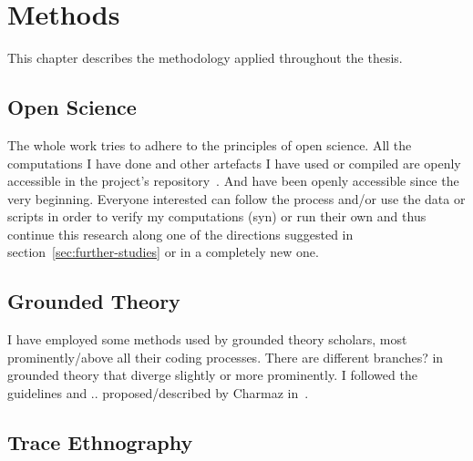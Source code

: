 \chapter{Methods}
\label{chap:methods}

This chapter describes the methodology applied throughout the thesis.

\section{Open Science}

The whole work tries to adhere to the principles of open science. %
All the computations I have done and other artefacts I have used or compiled are openly accessible in the project's repository~\cite{github}.
And have been openly accessible since the very beginning.
Everyone interested can follow the process and/or use the data or scripts in order to verify my computations (syn) or run their own and thus continue this research along one of the directions suggested in section~\ref{sec:further-studies} or in a completely new one.

\section{Grounded Theory}

I have employed some methods used by grounded theory %
scholars, most prominently/above all their coding processes.
There are different branches? in grounded theory that diverge slightly or more prominently.
I followed the guidelines and .. proposed/described by Charmaz in~\cite{Charmaz2006}.


\section{Trace Ethnography}

